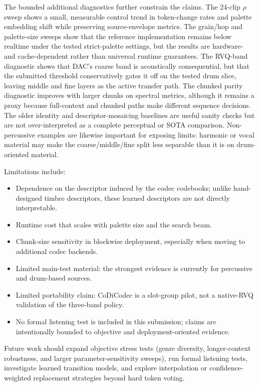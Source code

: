 \documentclass[twoside,a4paper]{article}
\begin{document}
The bounded additional diagnostics further constrain the claims. The 24-clip $\rho$ sweep shows a small, measurable control trend in token-change rates and palette embedding shift while preserving source-envelope metrics. The grain/hop and palette-size sweeps show that the reference implementation remains below realtime under the tested strict-palette settings, but the results are hardware- and cache-dependent rather than universal runtime guarantees. The RVQ-band diagnostic shows that DAC's coarse band is acoustically consequential, but that the submitted threshold conservatively gates it off on the tested drum slice, leaving middle and fine layers as the active transfer path. The chunked parity diagnostic improves with larger chunks on spectral metrics, although it remains a proxy because full-context and chunked paths make different sequence decisions. The older identity and descriptor-mosaicing baselines are useful sanity checks but are not over-interpreted as a complete perceptual or SOTA comparison. Non-percussive examples are likewise important for exposing limits: harmonic or vocal material may make the coarse/middle/fine split less separable than it is on drum-oriented material.

Limitations include:
\begin{itemize}
    \item Dependence on the descriptor induced by the codec codebooks; unlike hand-designed timbre descriptors, these learned descriptors are not directly interpretable.
    \item Runtime cost that scales with palette size and the search beam.
    \item Chunk-size sensitivity in blockwise deployment, especially when moving to additional codec backends.
    \item Limited main-test material: the strongest evidence is currently for percussive and drum-based sources.
    \item Limited portability claim: CoDiCodec is a slot-group pilot, not a native-RVQ validation of the three-band policy.
    \item No formal listening test is included in this submission; claims are intentionally bounded to objective and deployment-oriented evidence.
\end{itemize}

Future work should expand objective stress tests (genre diversity, longer-context robustness, and larger parameter-sensitivity sweeps), run formal listening tests, investigate learned transition models, and explore interpolation or confidence-weighted replacement strategies beyond hard token voting.
\end{document}

